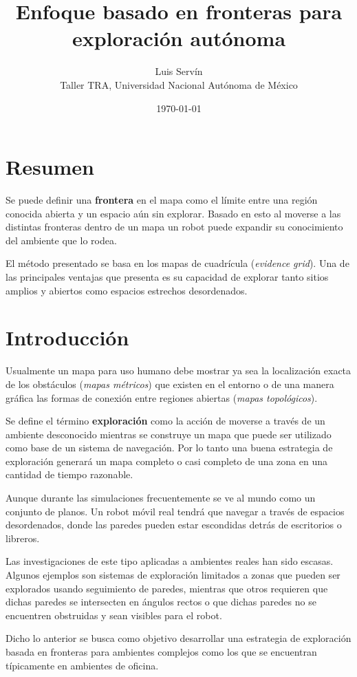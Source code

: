 \documentclass[11pt]{article}
\title{\vspace{-2ex}Enfoque basado en fronteras para exploración autónoma\vspace{-2ex}}
\date{\today}
\author{Luis Servín\\ Taller TRA, Universidad Nacional Autónoma de México}
\begin{document}
\maketitle

\section*{Resumen}

Se puede definir una \textbf{frontera} en el mapa como el límite entre una región conocida abierta y un espacio aún sin explorar. Basado en esto al moverse a las distintas fronteras dentro de un mapa un robot puede expandir su conocimiento del ambiente que lo rodea. 

El método presentado se basa en los mapas de cuadrícula (\emph{evidence grid}). Una de las principales ventajas que presenta es su capacidad de explorar tanto sitios amplios y abiertos como espacios estrechos desordenados.

\section{Introducción}

Usualmente un mapa para uso humano debe mostrar ya sea la localización exacta de los obstáculos (\emph{mapas métricos}) que existen en el entorno o de una manera gráfica las formas de conexión entre regiones abiertas (\emph{mapas topológicos}). 

Se define el término \textbf{exploración} como la acción de moverse a través de un ambiente desconocido mientras se construye un mapa que puede ser utilizado como base de un sistema de navegación. Por lo tanto una buena estrategia de exploración generará un mapa completo o casi completo de una zona en una cantidad de tiempo razonable.

Aunque durante las simulaciones frecuentemente se ve al mundo como un conjunto de planos. Un robot móvil real tendrá que navegar a través de espacios desordenados, donde las paredes pueden estar escondidas detrás de escritorios o libreros.

Las investigaciones de este tipo aplicadas a ambientes reales han sido escasas. Algunos ejemplos son sistemas de exploración limitados a zonas que pueden ser explorados usando seguimiento de paredes, mientras que otros requieren que dichas paredes se intersecten en ángulos rectos o que dichas paredes no se encuentren obstruidas y sean visibles para el robot.

Dicho lo anterior se busca como objetivo desarrollar una estrategia de exploración basada en fronteras para ambientes complejos como los que se encuentran típicamente en ambientes de oficina.
\end{document}
